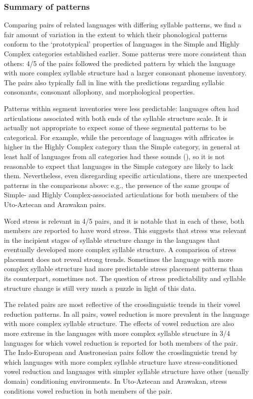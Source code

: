 \subsubsection{{Summary} {of} {patterns}}\label{sec:8.4.3.7}

  Comparing pairs of related languages with differing syllable patterns, we find a fair amount of variation in the extent to which their phonological patterns conform to the ‘prototypical’ properties of languages in the Simple and Highly Complex categories established earlier. Some patterns were more consistent than others: 4/5 of the pairs followed the predicted pattern by which the language with more complex syllable structure had a larger consonant phoneme inventory. The pairs also typically fall in line with the predictions regarding syllabic consonants, consonant allophony, and morphological properties.

  Patterns within segment inventories were less predictable: languages often had articulations associated with both ends of the syllable structure scale. It is actually not appropriate to expect some of these segmental patterns to be categorical. For example, while the percentage of languages with affricates is higher in the Highly Complex category than the Simple category, in general at least half of languages from all categories had these sounds (), so it is not reasonable to expect that languages in the Simple category are likely to lack them. Nevertheless, even disregarding specific articulations, there are unexpected patterns in the comparisons above: e.g., the presence of the same groups of Simple- and Highly Complex-associated articulations for both members of the Uto-Aztecan and Arawakan pairs.

  Word stress is relevant in 4/5 pairs, and it is notable that in each of these, both members are reported to have word stress. This suggests that stress was relevant in the incipient stages of syllable structure change in the languages that eventually developed more complex syllable structure. A comparison of stress placement does not reveal strong trends. Sometimes the language with more complex syllable structure had more predictable stress placement patterns than its counterpart, sometimes not. The question of stress predictability and syllable structure change is still very much a puzzle in light of this data.

  The related pairs are most reflective of the crosslinguistic trends in their vowel reduction patterns. In all pairs, vowel reduction is more prevalent in the language with more complex syllable structure. The effects of vowel reduction are also more extreme in the languages with more complex syllable structure in 3/4 languages for which vowel reduction is reported for both members of the pair. The Indo-European and Austronesian pairs follow the crosslinguistic trend by which languages with more complex syllable structure have stress-conditioned vowel reduction and languages with simpler syllable structure have other (usually domain) conditioning environments. In Uto-Aztecan and Arawakan, stress conditions vowel reduction in both members of the pair.

